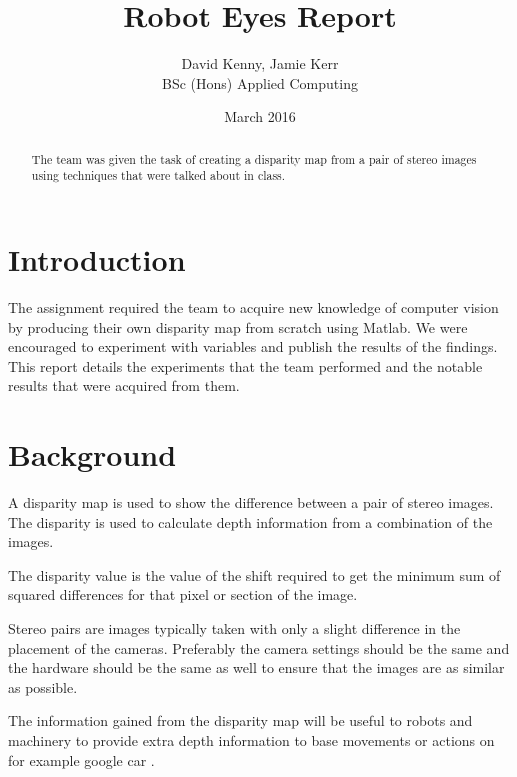 \documentclass[twocolumn]{article}
\title{Robot Eyes Report}
\author{David Kenny, Jamie Kerr\\BSc (Hons) Applied Computing}
\date{March 2016}
\begin{document}
\maketitle


\begin{abstract}

The team was given the task of creating a disparity map from a pair of stereo images using techniques that were talked about in class. 

\end{abstract}


\section{Introduction}
\vspace{-1ex}

The assignment required the team to acquire new knowledge of computer vision by producing their own disparity map from scratch using Matlab. We were encouraged to experiment with variables and publish the results of the findings. This report details the experiments that the team performed and the notable results that were acquired from them. 


\section{Background}
\vspace{-1ex}

A disparity map \cite{disparitymap} is used to show the difference between a pair of stereo images. The disparity is used to calculate depth information from a combination of the images. 

The disparity value is the value of the shift required to get the minimum sum of squared differences \cite{introssd} for that pixel or section of the image. 

Stereo pairs are images typically taken with only a slight difference in the placement of the cameras. Preferably the camera settings should be the same and the hardware should be the same as well to ensure that the images are as similar as possible.

The information gained from the disparity map will be useful to robots and machinery to provide extra depth information to base movements or actions on for example google car \cite{googlecar}.  
\end{document}
